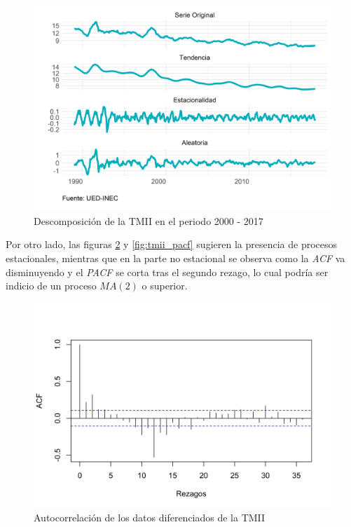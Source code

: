 \documentclass[
]{article}
\begin{document}
\begin{figure}[H]
\includegraphics[width=1\linewidth,height=1\textheight]{Tesis_files/figure-latex/tmiiplotdescomposicion-1} \caption{Descomposición de la TMII en el periodo 2000 - 2017}\label{fig:tmiiplotdescomposicion}
\end{figure}

Por otro lado, las figuras \ref{fig:tmii_acf} y \ref{fig:tmii_pacf}
sugieren la presencia de procesos estacionales, mientras que en la parte
no estacional se observa como la \emph{ACF} va disminuyendo y el
\emph{PACF} se corta tras el segundo rezago, lo cual podría ser indicio
de un proceso \(MA(2)\) o superior.

\begin{figure}[H]
\includegraphics[width=1\linewidth,height=1\textheight]{Tesis_files/figure-latex/tmii_acf-1} \caption{Autocorrelación de los datos diferenciados de la TMII}\label{fig:tmii_acf}
\end{figure}
\end{document}
